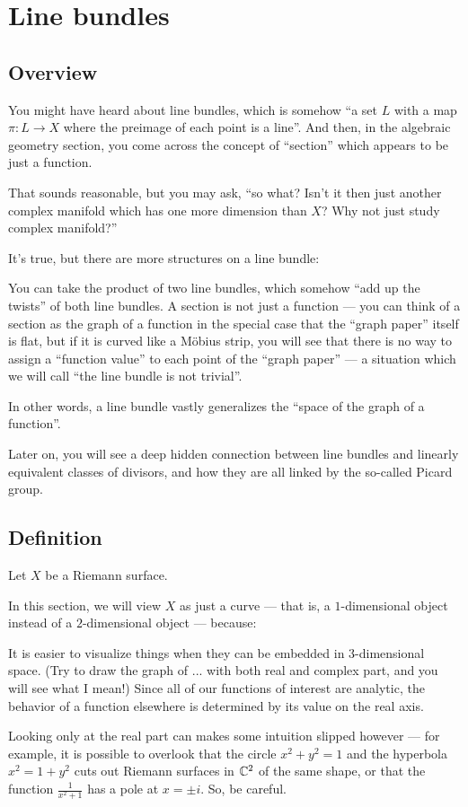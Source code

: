 \chapter{Line bundles}

\section{Overview}

You might have heard about line bundles, which is somehow ``a set $L$ with a map $\pi \colon L \to
X$ where the preimage of each point is a line''.
And then, in the algebraic geometry section, you come across the concept of ``section'' which
appears to be just a function.

That sounds reasonable, but you may ask, ``so what? Isn't it then just another complex manifold
which has one more dimension than $X$? Why not just study complex manifold?''

It's true, but there are more structures on a line bundle:
\begin{itemize}
	\ii You can take the product of two line bundles, which somehow ``add up the twists'' of
	both line bundles.
	\ii A section is not just a function --- you can think of a section as the graph of a function
	in the special case that the ``graph paper'' itself is flat, but if it is curved like a M\"obius
	strip, you will see that there is no way to assign a ``function value'' to each point of the
	``graph paper'' --- a situation which we will call ``the line bundle is not trivial''.
\end{itemize}

In other words, a line bundle vastly generalizes the ``space of the graph of a function''.

Later on, you will see a deep hidden connection between line bundles and linearly equivalent classes
of divisors, and how they are all linked by the so-called Picard group.

\section{Definition}

Let $X$ be a Riemann surface.

In this section, we will view $X$ as just a curve --- that is, a $1$-dimensional object instead of a
$2$-dimensional object --- because:
\begin{itemize}
	\ii It is easier to visualize things when they can be embedded in $3$-dimensional space.
	(Try to draw the graph of ... with both real and complex part, and you will see what I mean!)
	\ii Since all of our functions of interest are analytic, the behavior of a function elsewhere is
	determined by its value on the real axis.
\end{itemize}
Looking only at the real part can makes some intuition slipped however --- for example, it is
possible to overlook that the circle $x^2 + y^2 = 1$ and the hyperbola $x^2 = 1 + y^2$ cuts out
Riemann surfaces in $\mathbb C^2$ of the same shape, or that the function $\frac{1}{x^2 + 1}$ has a pole
at $x = \pm i$. So, be careful.

